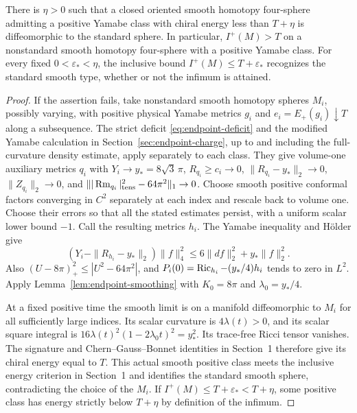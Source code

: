 \begin{theorem}\label{thm:endpoint-smoothing}
There is \(\eta>0\) such that a closed oriented smooth homotopy
four-sphere admitting a positive Yamabe class with chiral energy
less than \(T+\eta\) is diffeomorphic to the standard sphere. In
particular, \(I^+(M)>T\) on a nonstandard smooth homotopy four-sphere
with a positive Yamabe class. For every fixed \(0<\varepsilon_*<\eta\),
the inclusive bound \(I^+(M)\le T+\varepsilon_*\) recognizes the
standard smooth type, whether or not the infimum is attained.
\end{theorem}

\begin{proof}
If the assertion fails, take nonstandard smooth homotopy spheres
\(M_i\), possibly varying, with positive physical Yamabe metrics
\(g_i\) and \(e_i=E_+(g_i)\downarrow T\) along a subsequence. The
strict deficit \eqref{eq:endpoint-deficit} and the modified Yamabe
calculation in Section~\ref{sec:endpoint-charge}, up to and
including the full-curvature density estimate, apply separately to
each class. They give volume-one auxiliary metrics \(q_i\) with
\(Y_i\to y_*=8\sqrt3\,\pi\), \(R_{q_i}\ge c_i\to0\),
\(\|R_{q_i}-y_*\|_2\to0\), \(\|Z_{q_i}\|_2\to0\), and
\(\||\operatorname{Rm}_{q_i}|_{\rm tens}^2-64\pi^2\|_1\to0\).
Choose smooth positive conformal factors converging in \(C^2\)
separately at each index and rescale back to volume one. Choose their
errors so that all the stated estimates persist, with a uniform
scalar lower bound \(-1\). Call the resulting metrics \(h_i\).
The Yamabe inequality and H\"older give
\[
 (Y_i-\|R_{h_i}-y_*\|_2)\|f\|_4^2
 \le 6\|df\|_2^2+y_*\|f\|_2^2.
\]
Also \((U-8\pi)_+^2\le|U^2-64\pi^2|\), and
\(P_i(0)=\operatorname{Ric}_{h_i}-(y_*/4)h_i\) tends to zero in \(L^2\).
Apply Lemma~\ref{lem:endpoint-smoothing} with \(K_0=8\pi\) and
\(\lambda_0=y_*/4\).

At a fixed positive time the smooth limit is on a manifold
diffeomorphic to \(M_i\) for all sufficiently large indices. Its
scalar curvature is \(4\lambda(t)>0\), and its scalar square integral
is \(16\lambda(t)^2(1-2\lambda_0t)^2=y_*^2\). Its trace-free Ricci
tensor vanishes. The signature and Chern--Gauss--Bonnet identities
in Section~1 therefore give its chiral energy equal to \(T\).
This actual smooth positive class meets the inclusive energy
criterion in Section~1 and identifies the standard smooth sphere,
contradicting the choice of the \(M_i\). If
\(I^+(M)\le T+\varepsilon_*<T+\eta\), some positive class has
energy strictly below \(T+\eta\) by definition of the infimum.
\end{proof}
